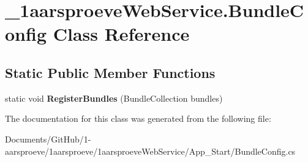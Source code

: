 \hypertarget{class__1aarsproeve_web_service_1_1_bundle_config}{}\section{\+\_\+1aarsproeve\+Web\+Service.\+Bundle\+Config Class Reference}
\label{class__1aarsproeve_web_service_1_1_bundle_config}
\subsection*{Static Public Member Functions}
\begin{DoxyCompactItemize}
\item 
\hypertarget{class__1aarsproeve_web_service_1_1_bundle_config_ab9a18fe210fb037e3bdb7405a0b456e6}{}static void {\bfseries Register\+Bundles} (Bundle\+Collection bundles)\label{class__1aarsproeve_web_service_1_1_bundle_config_ab9a18fe210fb037e3bdb7405a0b456e6}

\end{DoxyCompactItemize}


The documentation for this class was generated from the following file\+:\begin{DoxyCompactItemize}
\item 
Documents/\+Git\+Hub/1-\/aarsproeve/1aarsproeve/1aarsproeve\+Web\+Service/\+App\+\_\+\+Start/Bundle\+Config.\+cs\end{DoxyCompactItemize}
